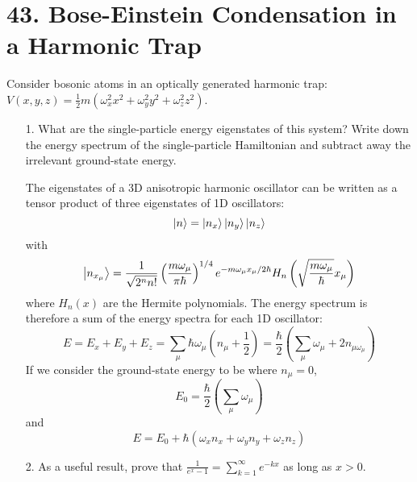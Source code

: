 \documentclass[a4paper,twoside]{article}
\begin{document}
\section*{43. Bose-Einstein Condensation in a Harmonic Trap}
Consider bosonic atoms in an optically generated harmonic trap: $ V(x, y, z) = \frac{1}{2} m(\omega_x^2 x^2 + \omega_y^2 y^2 + \omega_z^2 z^2) $.
\begin{itemize}
    \item[1.] What are the single-particle energy eigenstates of this system? Write down the energy spectrum of the single-particle Hamiltonian and subtract away the irrelevant ground-state energy.
        \begin{problem}
            The eigenstates of a 3D anisotropic harmonic oscillator can be written as a tensor product of three eigenstates of 1D oscillators:
            \begin{equation}
                \ket{n} =\ket{n_x}\ket{n_y}\ket{n_z}
            \end{equation}
            with
            \begin{equation}
                \ket{n_{x_{\mu}}} = \frac{1}{\sqrt{2^n n!}} \left( \frac{m \omega_{\mu}}{\pi \hbar} \right)^{1/4} e^{-m \omega_{\mu} x_{\mu} / 2 \hbar} H_n \left( \sqrt{\frac{m \omega_{\mu}}{\hbar}} x_{\mu} \right)
            \end{equation}
            where $ H_n(x) $ are the Hermite polynomials. The energy spectrum is therefore a sum of the energy spectra for each 1D oscillator:
            \begin{equation}
                E = E_x + E_y + E_z = \sum_{\mu} \hbar \omega_{\mu} \left( n_{\mu} + \frac{1}{2} \right) = \frac{\hbar}{2} (\sum_{\mu} \omega_{\mu} + 2 n_{\mu \omega_{\mu}})
            \end{equation}
            If we consider the ground-state energy to be where $ n_{\mu} = 0 $,
            \begin{equation}
                E_0 = \frac{\hbar}{2} (\sum_{\mu} \omega_{\mu})
            \end{equation}
            and
            \begin{equation}
                E = E_0 + \hbar (\omega_x n_x + \omega_y n_y + \omega_z n_z)
            \end{equation}
        \end{problem}
    \item[2.] As a useful result, prove that $ \frac{1}{e^x - 1} = \sum_{k=1}^{\infty} e^{- k x} $ as long as $ x > 0 $.

\end{itemize}
\end{document}
